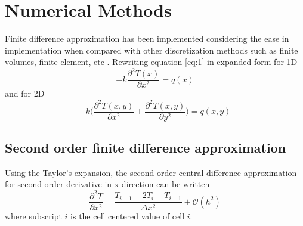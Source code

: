 \documentclass[12pt]{amsart}   %
\begin{document}
\section{Numerical Methods}
Finite difference approximation has been implemented considering the ease in implementation when compared with other discretization methods such as finite volumes, finite element, etc \cite{quarteroni2010numerical}. Rewriting equation \ref{eq:1} in expanded form for 1D
\begin{equation} \label{eq:5}
    -k \frac{\partial^2 T(x) }{\partial x^2} = q(x)
\end{equation}
and for 2D
\begin{equation}\label{eq:6new}
    -k \bigg(\frac{\partial^2 T(x,y) }{\partial x^2}+\frac{\partial^2 T(x,y) }{\partial y^2} \bigg) = q(x,y)
\end{equation}

\subsection{Second order finite difference approximation}
Using the Taylor's expansion, the second order central difference approximation for second order derivative in x direction can be written
\begin{equation}\label{eq:6}
 \frac{ \partial^2 T}{\partial x^2}=\frac{T_{i+1} -2T_{i} + T_{i-1}}{\Delta x^2}+\mathcal{O}(h^2)  
\end{equation}
where subscript $i$ is the cell centered value of cell $i$.
\end{document}
